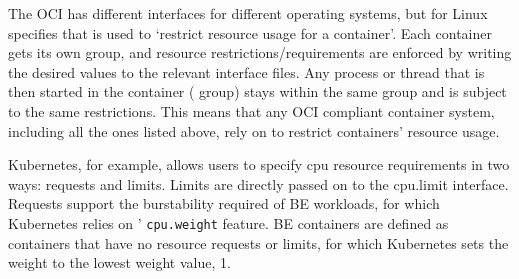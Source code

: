 The OCI has different interfaces for different operating systems, but for Linux
specifies that \cgroups{} is used to `restrict resource usage for a container'.
Each container gets its own group, and resource restrictions/requirements are
enforced by writing the desired values to the relevant \cgroups{} interface
files. Any process or thread that is then started in the container (\ie{} group)
stays within the same group and is subject to the same restrictions. This means
that any OCI compliant container system, including all the ones listed above,
rely on \cgroups{} to restrict containers' resource usage.

Kubernetes\cite{TODO}, for example, allows users to specify cpu resource
requirements in two ways: requests and limits. Limits are directly passed on to
the \cgroups{} cpu.limit interface. Requests support the burstability required
of BE workloads, for which Kubernetes relies on \cgroups{}' \texttt{cpu.weight}
feature. BE containers are defined as containers that have no resource requests
or limits, for which Kubernetes sets the weight to the lowest weight value,
\ie{} 1.











